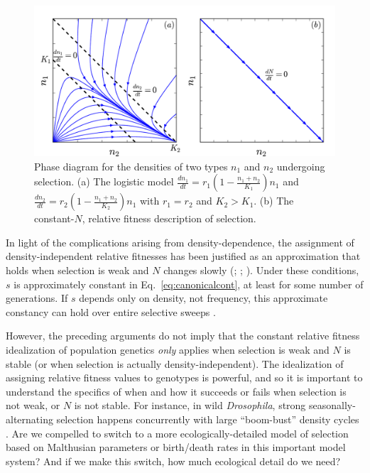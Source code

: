 \documentclass[12pt]{article}
\begin{document}
\begin{figure}
\centering
\includegraphics[scale=0.8]{Kplot.pdf}
\caption{\label{fig:Ksel} Phase diagram for the densities of two types $n_1$ and $n_2$ undergoing selection. (a) The logistic model $\frac{dn_1}{dt}=r_1(1-\frac{n_1+n_2}{K_1})n_1$ and $\frac{dn_2}{dt}=r_2(1-\frac{n_1+n_2}{K_2})n_1$ with $r_1=r_2$ and $K_2>K_1$. (b) The constant-$N$, relative fitness description of selection.}
\end{figure}

In light of the complications arising from density-dependence, the assignment of density-independent relative fitnesses has been justified as an approximation that holds when selection is weak and $N$ changes slowly (\citealt{kimura1969natural}; \citealt[pp. 277]{ewens_2004}; \citealt[Chap. 4]{charlesworth_1994}). Under these conditions, $s$ is approximately constant in Eq.~\eqref{eq:canonicalcont}, at least for some number of generations. If $s$ depends only on density, not frequency, this approximate constancy can hold over entire selective sweeps \citep{otto_2011}. 

However, the preceding arguments do not imply that the constant relative fitness idealization of population genetics \textit{only} applies when selection is weak and $N$ is stable (or when selection is actually density-independent). The idealization of assigning relative fitness values to genotypes is powerful, and so it is important to understand the specifics of when and how it succeeds or fails when selection is not weak, or $N$ is not stable. For instance, in wild \textit{Drosophila}, strong seasonally-alternating selection happens concurrently with large ``boom-bust'' density cycles \citep{messer_2016,bergland_14}. Are we compelled to switch to a more ecologically-detailed model of selection based on Malthusian parameters or birth/death rates in this important model system? And if we make this switch, how much ecological detail do we need? 
\end{document}
